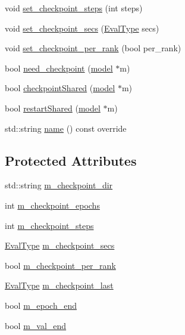 \begin{DoxyCompactItemize}
\item 
void \hyperlink{classlbann_1_1lbann__callback__checkpoint_aa385a1dda770ddf7a801134b96d3fcfd}{set\+\_\+checkpoint\+\_\+steps} (int steps)
\item 
void \hyperlink{classlbann_1_1lbann__callback__checkpoint_a91a0e5627986654d719930ba5eeebc9e}{set\+\_\+checkpoint\+\_\+secs} (\hyperlink{base_8hpp_a3266f5ac18504bbadea983c109566867}{Eval\+Type} secs)
\item 
void \hyperlink{classlbann_1_1lbann__callback__checkpoint_ac3a0bb250a679b28924910c0dc617809}{set\+\_\+checkpoint\+\_\+per\+\_\+rank} (bool per\+\_\+rank)
\item 
bool \hyperlink{classlbann_1_1lbann__callback__checkpoint_a2e5f396667ccc45f7203263b06c5e216}{need\+\_\+checkpoint} (\hyperlink{classlbann_1_1model}{model} $\ast$m)
\item 
bool \hyperlink{classlbann_1_1lbann__callback__checkpoint_a23b6f5abb924b2c4d0694e98c7d6f4d5}{checkpoint\+Shared} (\hyperlink{classlbann_1_1model}{model} $\ast$m)
\item 
bool \hyperlink{classlbann_1_1lbann__callback__checkpoint_a40d369278bc5963ba2f3cca1750ba004}{restart\+Shared} (\hyperlink{classlbann_1_1model}{model} $\ast$m)
\item 
std\+::string \hyperlink{classlbann_1_1lbann__callback__checkpoint_aa1afa81c9638bf76fb6ecfe91d07a88e}{name} () const override
\end{DoxyCompactItemize}
\subsection*{Protected Attributes}
\begin{DoxyCompactItemize}
\item 
std\+::string \hyperlink{classlbann_1_1lbann__callback__checkpoint_ac89386fda60744e6399f97003fea3711}{m\+\_\+checkpoint\+\_\+dir}
\item 
int \hyperlink{classlbann_1_1lbann__callback__checkpoint_ad6f4399effadedb26e33fc39a3c6915e}{m\+\_\+checkpoint\+\_\+epochs}
\item 
int \hyperlink{classlbann_1_1lbann__callback__checkpoint_ad6debea7d9bbebd3ee0323acec11516f}{m\+\_\+checkpoint\+\_\+steps}
\item 
\hyperlink{base_8hpp_a3266f5ac18504bbadea983c109566867}{Eval\+Type} \hyperlink{classlbann_1_1lbann__callback__checkpoint_a285658a96f8546952c9016ef4cc12161}{m\+\_\+checkpoint\+\_\+secs}
\item 
bool \hyperlink{classlbann_1_1lbann__callback__checkpoint_a36af7331ddf213339fe7282cb53ffedc}{m\+\_\+checkpoint\+\_\+per\+\_\+rank}
\item 
\hyperlink{base_8hpp_a3266f5ac18504bbadea983c109566867}{Eval\+Type} \hyperlink{classlbann_1_1lbann__callback__checkpoint_a842304929c265ffa9d285e635fbbbbd7}{m\+\_\+checkpoint\+\_\+last}
\item 
bool \hyperlink{classlbann_1_1lbann__callback__checkpoint_a9632d5f0078d3ff2015e96dba789e15c}{m\+\_\+epoch\+\_\+end}
\item 
bool \hyperlink{classlbann_1_1lbann__callback__checkpoint_a3827e5bb569f80d790c3ac856a7c39b5}{m\+\_\+val\+\_\+end}
\end{DoxyCompactItemize}



